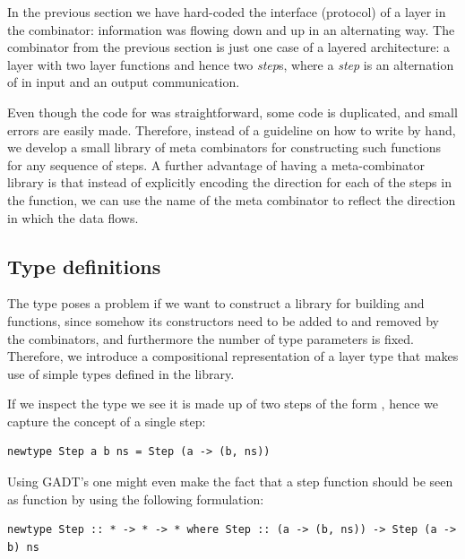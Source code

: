 \documentclass{llncs}
\begin{document}
In the previous section we have hard-coded the interface (protocol) of a layer in the  combinator: information was flowing down and up in an alternating way. The  combinator from the previous section is just one case of a layered architecture: a layer with two layer functions and hence two {\em step}s, where a {\em step} is an alternation of in input and an output communication.

Even though the code for  was straightforward, some code is duplicated, and small errors are easily made. Therefore, instead of a guideline on how to write  by hand, we develop a small library of meta combinators for constructing such  functions for any sequence of steps. A further  advantage of having  a meta-combinator library is that instead of explicitly encoding the direction for each of the steps in the  function, we can use the name of the meta combinator to reflect the direction in which the data flows. 


\subsection{Type definitions} \label{subsecttypedef}

The  type poses a problem if we want to construct a library for building  and  functions, since somehow its constructors need to be added to and removed by the combinators, and furthermore the number of type parameters is fixed. Therefore, we introduce a compositional representation of a layer type that makes use of simple types defined in the library.

If we inspect the  type we see it is made up of two steps of the form , hence we capture the concept of a single step: 

\begin{small}
\begin{verbatim}
newtype Step a b ns = Step (a -> (b, ns))
\end{verbatim}
\end{small}

\bc
Using GADT's one might even make the fact that a step function should be seen as function by using the following formulation:

\begin{small}
\begin{verbatim}
newtype Step :: * -> * -> * where Step :: (a -> (b, ns)) -> Step (a -> b) ns
\end{verbatim}
\end{small}
\ec
\end{document}
